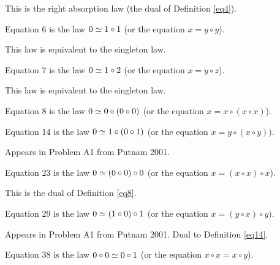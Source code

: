 This is the right absorption law (the dual of Definition \ref{eq4}).

\begin{definition}[Equation 6]\label{eq6}\leanok{}  Equation 6 is the law $0 \simeq 1 \circ 1$ (or the equation $x = y \circ y$).
\end{definition}

This law is equivalent to the singleton law.

\begin{definition}[Equation 7]\label{eq7}\leanok{}  Equation 7 is the law $0 \simeq 1 \circ 2$ (or the equation $x = y \circ z$).
\end{definition}

This law is equivalent to the singleton law.

\begin{definition}[Equation 8]\label{eq8}\leanok{}  Equation 8 is the law $0 \simeq 0 \circ (0 \circ 0)$ (or the equation $x = x \circ (x \circ x)$).
\end{definition}

\begin{definition}[Equation 14]\label{eq14}\leanok{}  Equation 14 is the law $0 \simeq  1 \circ (0 \circ 1)$ (or the equation $x = y ∘ (x ∘ y))$.
\end{definition}

Appears in Problem A1 from Putnam 2001.


\begin{definition}[Equation 23]\label{eq23}\leanok{}  Equation 23 is the law $0 \simeq  (0 \circ 0) \circ 0$ (or the equation $x = (x \circ x) \circ x$).
\end{definition}

This is the dual of Definition \ref{eq8}.

\begin{definition}[Equation 29]\label{eq29}\leanok{}  Equation 29 is the law $0 \simeq  (1 \circ 0) \circ 1$ (or the equation $x = (y ∘ x) ∘ y)$.
\end{definition}

Appears in Problem A1 from Putnam 2001.  Dual to Definition \ref{eq14}.

\begin{definition}[Equation 38]\label{eq38}\leanok{}  Equation 38 is the law $0 \circ 0  \simeq  0 \circ 1$ (or the equation $x \circ x = x \circ y$).
\end{definition}

